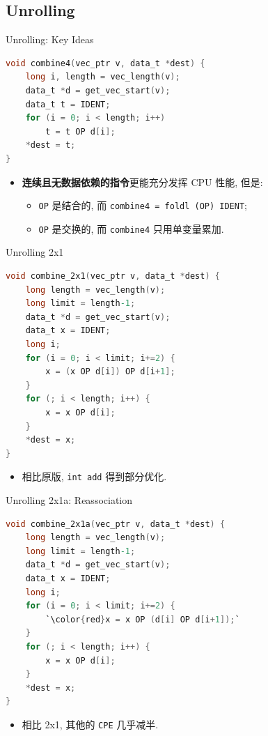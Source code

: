 ﻿\documentclass{ctexbeamer}
\begin{document}
\subsection{Unrolling}

\begin{frame}[fragile]{Unrolling: Key Ideas}
  \begin{lstlisting}[language=C]
void combine4(vec_ptr v, data_t *dest) {
    long i, length = vec_length(v);
    data_t *d = get_vec_start(v);
    data_t t = IDENT;
    for (i = 0; i < length; i++)
        t = t OP d[i];
    *dest = t;
}
  \end{lstlisting}

  \begin{itemize}
    \item \textbf{连续且无数据依赖的指令}更能充分发挥 CPU 性能, 但是:
    \begin{itemize}
      \item \texttt{OP} 是结合的, 而 \texttt{combine4 = foldl (OP) IDENT};
      \item \texttt{OP} 是交换的, 而 \texttt{combine4} 只用单变量累加.
    \end{itemize}
  \end{itemize}
\end{frame}

\begin{frame}[fragile,shrink=5]{Unrolling 2x1}
  \begin{lstlisting}[language=C]
void combine_2x1(vec_ptr v, data_t *dest) {
    long length = vec_length(v);
    long limit = length-1;
    data_t *d = get_vec_start(v);
    data_t x = IDENT;
    long i;
    for (i = 0; i < limit; i+=2) {
        x = (x OP d[i]) OP d[i+1];
    }
    for (; i < length; i++) {
        x = x OP d[i];
    }
    *dest = x;
}
  \end{lstlisting}

  \begin{itemize}
    \item 相比原版, \texttt{int add} 得到部分优化.
  \end{itemize}
\end{frame}

\begin{frame}[fragile,shrink=5]{Unrolling 2x1a: Reassociation}
  \begin{lstlisting}[language=C]
void combine_2x1a(vec_ptr v, data_t *dest) {
    long length = vec_length(v);
    long limit = length-1;
    data_t *d = get_vec_start(v);
    data_t x = IDENT;
    long i;
    for (i = 0; i < limit; i+=2) {
        `\color{red}x = x OP (d[i] OP d[i+1]);`
    }
    for (; i < length; i++) {
        x = x OP d[i];
    }
    *dest = x;
}
  \end{lstlisting}

  \begin{itemize}
    \item 相比 2x1, 其他的 \texttt{CPE} 几乎减半.
  \end{itemize}
\end{frame}
\end{document}
